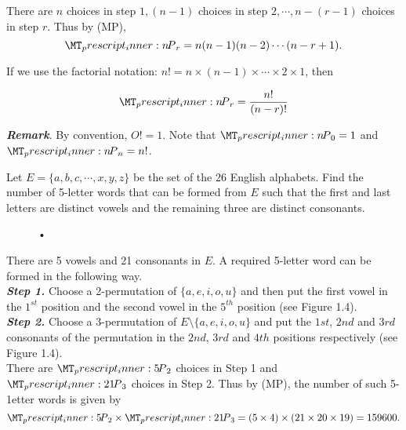 \documentclass[a4paper,11pt]{book}
\newcommand\perm[2][^n]{\prescript{#1\mkern-2.5mu}{}P_{#2}}
\begin{document}
There are $n$ choices in step $1, (n - 1)$ choices in step $2,\cdots, n - (r - 1)$ 
choices in step $r$. Thus by (MP), 
\[ \perm[n]{r} = n(n - 1)(n - 2)\cdots (n - r + 1).\] 

If we use the factorial notation: $n! = n \times (n - 1) \times \cdots \times 2 \times 1$, then 

\[ \perm[n]{r} = \dfrac{n!}{(n-r)!}\]

\textbf{ \textit{ Remark}}. By convention, $O! = 1$. Note that $\perm[n]{0} = 1$ and  $\perm[n]{n} = n!$. 
\begin{example}
Let $E = \{a,b,c,\cdots,x,y,z\}$ be the set of the 26 English alphabets. Find the number of 5-letter words that can be formed from $E$ such that the first and last letters are distinct vowels and the remaining three are distinct consonants. 
\end{example}

\begin{figure}[h]
\begin{center}
\caption{•}
\end{center}
\end{figure}

\begin{soln}
There are 5 vowels and 21 consonants in $E$. A required 5-letter word can be formed in the following way. \\
\textbf{ \textit{ Step 1.}} Choose a 2-permutation of $\{a, e, i, o, u\}$ and then put the first vowel in the $1^{st}$ position and the second vowel in the $5^{th}$ position (see Figure 1.4). \\
\textbf{\textit{ Step 2.}} Choose a 3-permutation of $E\setminus \{a, e, i, o, u\}$ and put the $1st$, $2nd$ and $3rd$ consonants of the permutation in the $2nd$, $3rd$ and $4th$ positions respectively (see Figure 1.4). \\

There are $\perm[5]{2}$ choices in Step 1 and $\perm[21]{3}$ choices in Step 2. Thus by (MP), the number of such 5-1etter words is given by 
\[\perm[5]{2}\times \perm[21]{3} = (5 \times 4) \times (21 \times 20 \times 19) = 159600. \]
\end{soln}
\end{document}
